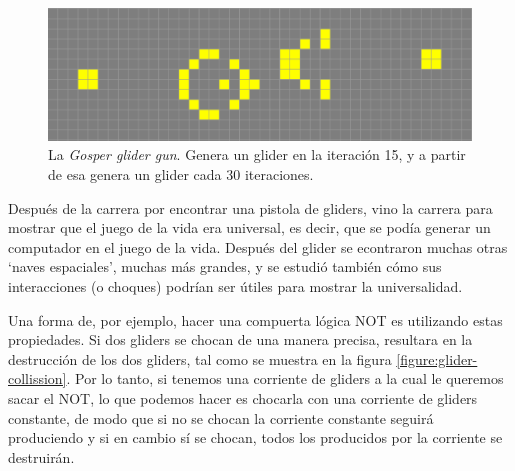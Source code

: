 \begin{figure}[h]
    \centering
    \includegraphics[width=.8\textwidth]{images/life-gosper-gun.png}
    \caption{La \textit{Gosper glider gun}. Genera un glider en la iteraci\'on 15, y a partir de esa genera un glider cada 30 iteraciones.}
    \label{figure:gosper-gun}
\end{figure}

Despu\'es de la carrera por encontrar una pistola de gliders, vino la carrera para mostrar que el juego de la vida era universal, es decir, que se pod\'ia generar un computador en el juego de la vida. Despu\'es del glider se econtraron muchas otras `naves espaciales', muchas m\'as grandes, y se estudi\'o tambi\'en c\'omo sus interacciones (o choques) podr\'ian ser \'utiles para mostrar la universalidad.

Una forma de, por ejemplo, hacer una compuerta l\'ogica NOT es utilizando estas propiedades. Si dos gliders se chocan de una manera precisa, resultara en la destrucci\'on de los dos gliders, tal como se muestra en la figura \ref{figure:glider-collission}. Por lo tanto, si tenemos una corriente de gliders a la cual le queremos sacar el NOT, lo que podemos hacer es chocarla con una corriente de gliders constante, de modo que si no se chocan la corriente constante seguir\'a produciendo y si en cambio s\'i se chocan, todos los producidos por la corriente se destruir\'an.

